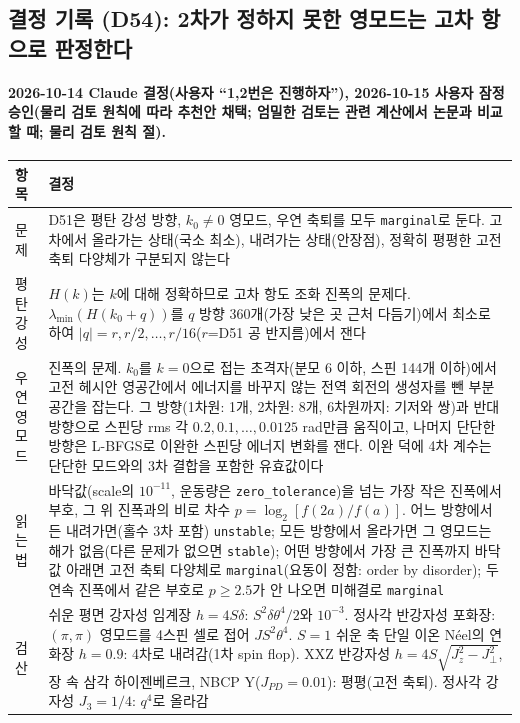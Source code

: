 \subsection{결정 기록 (D54): 2차가 정하지 못한 영모드는 고차 항으로 판정한다}\label{decisions-d54-higher-order-stability}
\begingroup%
  \framesubtitle{2026-10-14 Claude 결정(사용자 ``1,2번은 진행하자''), 2026-10-15 사용자 잠정 승인(물리 검토 원칙에 따라 추천안 채택; 엄밀한 검토는 관련 계산에서 논문과 비교할 때; 물리 검토 원칙 절).}
  \small\renewcommand{\arraystretch}{1.12}
  \begin{tabularx}{\textwidth}{@{}P{3.0cm}Y@{}}
    \toprule
    항목 & 결정 \\
    \midrule
    문제 & D51은 평탄 강성 방향, $k_0\ne0$ 영모드, 우연 축퇴를 모두 \texttt{marginal}로 둔다. 고차에서 올라가는 상태(국소 최소), 내려가는 상태(안장점), 정확히 평평한 고전 축퇴 다양체가 구분되지 않는다 \\
    평탄 강성 & $H(k)$는 $k$에 대해 정확하므로 고차 항도 조화 진폭의 문제다. $\lambda_{\min}(H(k_0+q))$를 $q$ 방향 360개(가장 낮은 곳 근처 다듬기)에서 최소로 하여 $|q|=r,r/2,\dots,r/16$($r$=D51 공 반지름)에서 잰다 \\
    우연 영모드 & 진폭의 문제. $k_0$를 $k=0$으로 접는 초격자(분모 6 이하, 스핀 144개 이하)에서 고전 헤시안 영공간에서 에너지를 바꾸지 않는 전역 회전의 생성자를 뺀 부분공간을 잡는다. 그 방향(1차원: 1개, 2차원: 8개, 6차원까지: 기저와 쌍)과 반대 방향으로 스핀당 rms 각 $0.2,0.1,\dots,0.0125$ rad만큼 움직이고, 나머지 단단한 방향은 L-BFGS로 이완한 스핀당 에너지 변화를 잰다. 이완 덕에 4차 계수는 단단한 모드와의 3차 결합을 포함한 유효값이다 \\
    읽는 법 & 바닥값(scale의 $10^{-11}$, 운동량은 \texttt{zero\_tolerance})을 넘는 가장 작은 진폭에서 부호, 그 위 진폭과의 비로 차수 $p=\log_2[f(2a)/f(a)]$. 어느 방향에서든 내려가면(홀수 3차 포함) \texttt{unstable}; 모든 방향에서 올라가면 그 영모드는 해가 없음(다른 문제가 없으면 \texttt{stable}); 어떤 방향에서 가장 큰 진폭까지 바닥값 아래면 고전 축퇴 다양체로 \texttt{marginal}(요동이 정함: order by disorder); 두 연속 진폭에서 같은 부호로 $p\ge2.5$가 안 나오면 미해결로 \texttt{marginal} \\
    검산 & 쉬운 평면 강자성 임계장 $h=4S\delta$: $S^2\delta\theta^4/2$와 $10^{-3}$. 정사각 반강자성 포화장: $(\pi,\pi)$ 영모드를 4스핀 셀로 접어 $JS^2\theta^4$. $S=1$ 쉬운 축 단일 이온 Néel의 연화장 $h=0.9$: 4차로 내려감(1차 spin flop). XXZ 반강자성 $h=4S\sqrt{J_z^2-J_\perp^2}$, 장 속 삼각 하이젠베르크, NBCP Y($J_{PD}=0.01$): 평평(고전 축퇴). 정사각 강자성 $J_3=1/4$: $q^4$로 올라감 \\

\end{tabularx}
